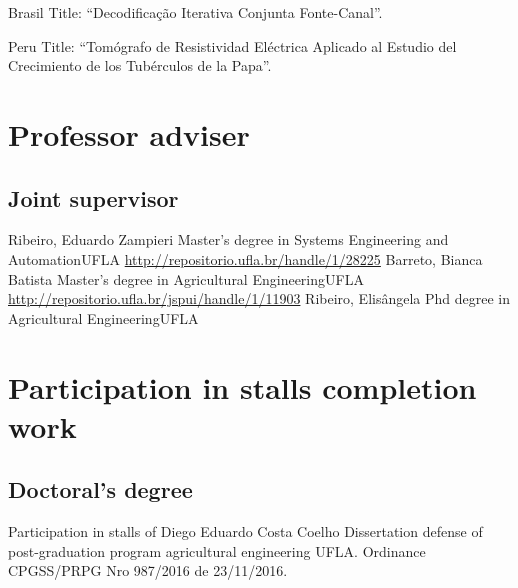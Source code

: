 \documentclass[11pt,a4paper,sans]{moderncv} %
\begin{document}
	      {Brasil}{}{}%
	      {Title: ``Decodificação Iterativa Conjunta Fonte-Canal''.}

	      {Peru}{}{}
	      {Title: ``Tomógrafo de Resistividad Eléctrica Aplicado al Estudio del Crecimiento de los Tubérculos de la Papa''.}


	       
\section{Professor adviser}
\subsection{Joint supervisor}
			{Ribeiro, Eduardo Zampieri}
			{Master's degree in Systems Engineering and Automation}{UFLA}
			{\url{http://repositorio.ufla.br/handle/1/28225}}
			{Barreto, Bianca Batista}
			{Master's degree in Agricultural Engineering}{UFLA}
			{\url{http://repositorio.ufla.br/jspui/handle/1/11903}}
			{Ribeiro, Elisângela }
			{Phd degree in Agricultural Engineering}{UFLA}
			{~}

\section{Participation in stalls completion work}

\subsection{Doctoral's degree}
			{Participation in stalls of Diego Eduardo Costa Coelho}
			{Dissertation defense of post-graduation program agricultural engineering}{}
			{UFLA. Ordinance CPGSS/PRPG Nro 987/2016 de 23/11/2016.}
\end{document}
